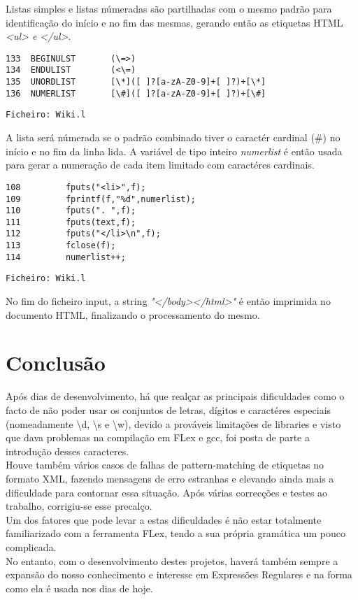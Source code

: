 \documentclass[11pt,a4paper]{report}
\begin{document}
Listas simples e listas númeradas são partilhadas com o mesmo padrão para identificação do início e no fim das mesmas, gerando então as etiquetas HTML \emph{<ul> e </ul>}.

\begin{verbatim}
133  BEGINULST       (\=>)
134  ENDULIST        (<\=)
135  UNORDLIST       [\*]([ ]?[a-zA-Z0-9]+[ ]?)+[\*]
136  NUMERLIST       [\#]([ ]?[a-zA-Z0-9]+[ ]?)+[\#]
\end{verbatim}
\begin{flushright}
\texttt{Ficheiro: Wiki.l}
\end{flushright}

A lista será númerada se o padrão combinado tiver o caractér cardinal (\#) no início e no fim da linha lida.
A variável de tipo inteiro \emph{numerlist} é então usada para gerar a numeração de cada item limitado com caractéres cardinais.
\begin{verbatim}
108         fputs("<li>",f);
109         fprintf(f,"%d",numerlist);
110         fputs(". ",f);
111         fputs(text,f);
112         fputs("</li>\n",f);
113         fclose(f);
114         numerlist++;
\end{verbatim}
\begin{flushright}
\texttt{Ficheiro: Wiki.l}
\end{flushright}

No fim do ficheiro input, a string \emph{"\n</body>\n</html>\n"} é então imprimida no documento HTML, finalizando o processamento do mesmo.



\chapter{Conclusão}

Após dias de desenvolvimento, há que realçar as principais dificuldades como o facto de não poder usar os conjuntos de letras, dígitos e caractéres especiais (nomeadamente \textbackslash d, \textbackslash s e \textbackslash w), devido a prováveis limitações de libraries e visto que dava problemas na compilação em FLex e gcc, foi posta de parte a introdução desses caracteres.
\\


Houve também vários casos de falhas de pattern-matching de etiquetas no formato XML, fazendo mensagens de erro estranhas e elevando ainda mais a dificuldade para contornar essa situação.
Após várias correcções e testes ao trabalho, corrigiu-se esse precalço.
\\


Um dos fatores que pode levar a estas dificuldades é não estar totalmente familiarizado com a ferramenta FLex, tendo a sua própria gramática um pouco complicada.
\\

No entanto, com o desenvolvimento destes projetos, haverá também sempre a expansão do nosso conhecimento e interesse em Expressões Regulares e na forma como ela é usada nos dias de hoje.
\end{document}
